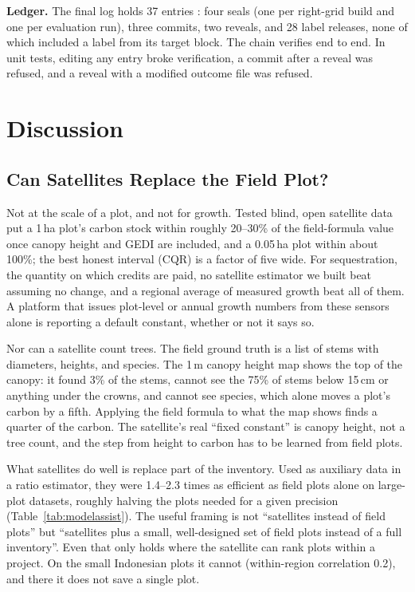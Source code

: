 \documentclass[conference,a4paper]{IEEEtran}
\begin{document}
\textbf{Ledger.} The final log holds 37 entries : four seals (one per right-grid build and one per evaluation run), three commits, two reveals, and 28 label releases, none of which included a label from its target block. The chain verifies end to end. In unit tests, editing any entry broke verification, a commit after a reveal was refused, and a reveal with a modified outcome file was refused.

\section{Discussion}

\subsection{Can Satellites Replace the Field Plot?}
Not at the scale of a plot, and not for growth. Tested blind, open satellite data put a 1\,ha plot's carbon stock within roughly 20--30\% of the field-formula value once canopy height and GEDI are included, and a 0.05\,ha plot within about 100\%; the best honest interval (CQR) is a factor of five wide. For sequestration, the quantity on which credits are paid, no satellite estimator we built beat assuming no change, and a regional average of measured growth beat all of them. A platform that issues plot-level or annual growth numbers from these sensors alone is reporting a default constant, whether or not it says so.

Nor can a satellite count trees. The field ground truth is a list of stems with diameters, heights, and species. The 1\,m canopy height map shows the top of the canopy: it found 3\% of the stems, cannot see the 75\% of stems below 15\,cm or anything under the crowns, and cannot see species, which alone moves a plot's carbon by a fifth. Applying the field formula to what the map shows finds a quarter of the carbon. The satellite's real ``fixed constant'' is canopy height, not a tree count, and the step from height to carbon has to be learned from field plots.

What satellites do well is replace part of the inventory. Used as auxiliary data in a ratio estimator, they were 1.4--2.3 times as efficient as field plots alone on large-plot datasets, roughly halving the plots needed for a given precision (Table~\ref{tab:modelassist}). The useful framing is not ``satellites instead of field plots'' but ``satellites plus a small, well-designed set of field plots instead of a full inventory''. Even that only holds where the satellite can rank plots within a project. On the small Indonesian plots it cannot (within-region correlation 0.2), and there it does not save a single plot.
\end{document}
